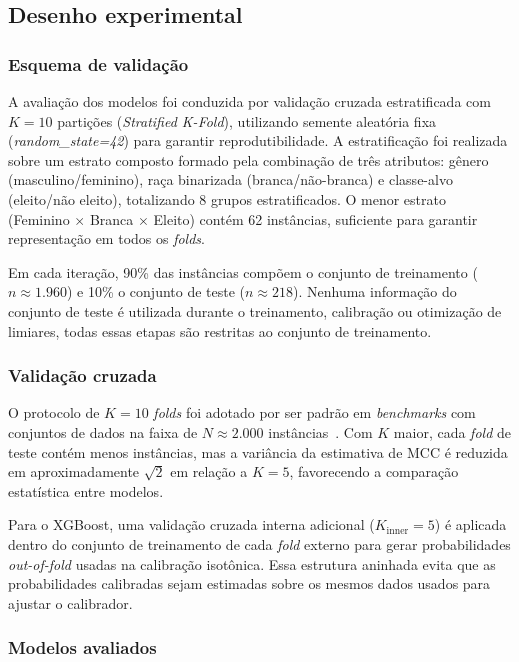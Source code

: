 \documentclass[12pt]{article}
\begin{document}
\subsection{Desenho experimental}

\subsubsection{Esquema de validação}

A avaliação dos modelos foi conduzida por validação cruzada estratificada com $K=10$ partições (\textit{Stratified K-Fold}), utilizando semente aleatória fixa (\textit{random\_state=42}) para garantir reprodutibilidade. A estratificação foi realizada sobre um estrato composto formado pela combinação de três atributos: gênero (masculino/feminino), raça binarizada (branca/não-branca) e classe-alvo (eleito/não eleito), totalizando 8 grupos estratificados. O menor estrato (Feminino $\times$ Branca $\times$ Eleito) contém 62 instâncias, suficiente para garantir representação em todos os \textit{folds}.

Em cada iteração, 90\% das instâncias compõem o conjunto de treinamento ($n \approx 1.960$) e 10\% o conjunto de teste ($n \approx 218$). Nenhuma informação do conjunto de teste é utilizada durante o treinamento, calibração ou otimização de limiares, todas essas etapas são restritas ao conjunto de treinamento.

\subsubsection{Validação cruzada}

O protocolo de $K=10$ \textit{folds} foi adotado por ser padrão em \textit{benchmarks} com conjuntos de dados na faixa de $N \approx 2.000$ instâncias~\cite{kohavi:1995}. Com $K$ maior, cada \textit{fold} de teste contém menos instâncias, mas a variância da estimativa de MCC é reduzida em aproximadamente $\sqrt{2}$ em relação a $K=5$, favorecendo a comparação estatística entre modelos.

Para o XGBoost, uma validação cruzada interna adicional ($K_{\text{inner}}=5$) é aplicada dentro do conjunto de treinamento de cada \textit{fold} externo para gerar probabilidades \textit{out-of-fold} usadas na calibração isotônica. Essa estrutura aninhada evita que as probabilidades calibradas sejam estimadas sobre os mesmos dados usados para ajustar o calibrador.

\subsubsection{Modelos avaliados}
\end{document}
